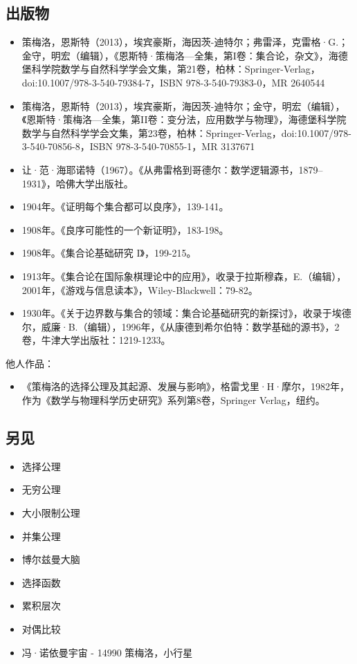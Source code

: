 \subsection{出版物}
\begin{itemize}
\item 策梅洛，恩斯特（2013），埃宾豪斯，海因茨-迪特尔；弗雷泽，克雷格·G.；金守，明宏（编辑），《恩斯特·策梅洛—全集，第I卷：集合论，杂文》，海德堡科学院数学与自然科学学会文集，第21卷，柏林：Springer-Verlag，doi:10.1007/978-3-540-79384-7，ISBN 978-3-540-79383-0，MR 2640544  
\item 策梅洛，恩斯特（2013），埃宾豪斯，海因茨-迪特尔；金守，明宏（编辑），《恩斯特·策梅洛—全集，第II卷：变分法，应用数学与物理》，海德堡科学院数学与自然科学学会文集，第23卷，柏林：Springer-Verlag，doi:10.1007/978-3-540-70856-8，ISBN 978-3-540-70855-1，MR 3137671

\item 让·范·海耶诺特（1967）。《从弗雷格到哥德尔：数学逻辑源书，1879–1931》，哈佛大学出版社。  
\item 1904年。《证明每个集合都可以良序》，139-141。  
\item 1908年。《良序可能性的一个新证明》，183-198。  
\item 1908年。《集合论基础研究 I》，199-215。  
\item 1913年。《集合论在国际象棋理论中的应用》，收录于拉斯穆森，E.（编辑），2001年，《游戏与信息读本》，Wiley-Blackwell：79-82。  
\item 1930年。《关于边界数与集合的领域：集合论基础研究的新探讨》，收录于埃德尔，威廉·B.（编辑），1996年，《从康德到希尔伯特：数学基础的源书》，2卷，牛津大学出版社：1219-1233。
\end{itemize}
他人作品：
\begin{itemize}
\item 《策梅洛的选择公理及其起源、发展与影响》，格雷戈里·H·摩尔，1982年，作为《数学与物理科学历史研究》系列第8卷，Springer Verlag，纽约。
\end{itemize}
\subsection{另见}
\begin{itemize}
\item 选择公理
\item 无穷公理
\item 大小限制公理
\item 并集公理
\item 博尔兹曼大脑
\item 选择函数
\item 累积层次
\item 对偶比较
\item 冯·诺依曼宇宙
- 14990 策梅洛，小行星
\end{itemize}
